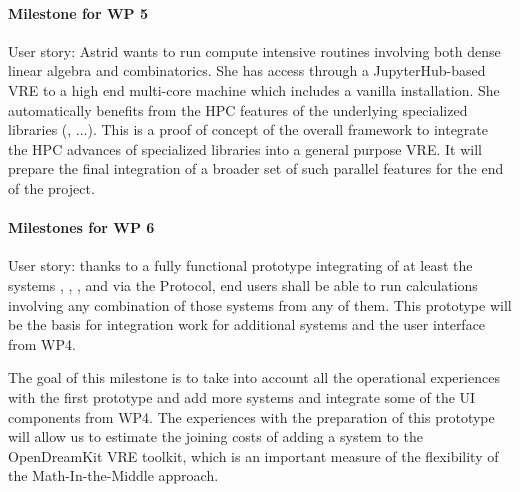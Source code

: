 \paragraph{Milestone for WP 5}

\begin{milestones}
  {
    User story: Astrid wants to run compute intensive routines
    involving both dense linear algebra and combinatorics. She has
    access through a JupyterHub-based VRE to a high end multi-core
    machine which includes a vanilla \Sage installation. She
    automatically benefits from the HPC features of the underlying
    specialized libraries (\Linbox, ...). This is a proof of concept
    of the overall framework to integrate the HPC advances of
    specialized libraries into a general purpose VRE.
    It will prepare the final integration of a broader set of such
    parallel features for the end of the project.
  }
\end{milestones}


\paragraph{Milestones for WP 6}

\begin{milestones}

  {User story: thanks to a fully functional prototype integrating of
    at least the systems \GAP, \Sage, \Singular, and \LMFDB via the
    \SCSCP Protocol, end users shall be able to run calculations
    involving any combination of those systems from any of them. This
    prototype will be the basis for integration work for additional
    systems and the user interface from WP4.}

  {The goal of this milestone is to take into account all the operational 
    experiences with the first prototype and add more systems and integrate some
    of the UI components from WP4. The experiences with the preparation of 
    this prototype will allow us to estimate the joining costs of adding a system 
    to the OpenDreamKit VRE toolkit, which is an important measure of the 
    flexibility of the Math-In-the-Middle approach.}
\end{milestones}


